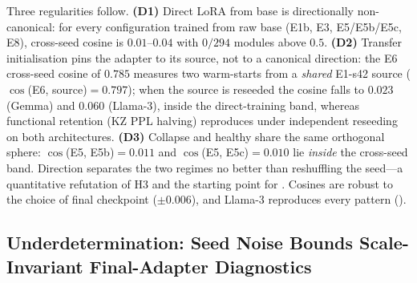 \documentclass[11pt]{article}
\begin{document}
Three regularities follow. \textbf{(D1)} Direct LoRA from base is directionally non-canonical: for every configuration trained from raw base (E1b, E3, E5/E5b/E5c, E8), cross-seed cosine is $0.01$--$0.04$ with $0/294$ modules above $0.5$. \textbf{(D2)} Transfer initialisation pins the adapter to its source, not to a canonical direction: the E6 cross-seed cosine of $0.785$ measures two warm-starts from a \emph{shared} E1-s42 source ($\cos$(E6, source)$=0.797$); when the source is reseeded the cosine falls to $0.023$ (Gemma) and $0.060$ (Llama-3), inside the direct-training band, whereas functional retention (KZ PPL halving) reproduces under independent reseeding on both architectures. \textbf{(D3)} Collapse and healthy share the same orthogonal sphere: $\cos$(E5, E5b)$=0.011$ and $\cos$(E5, E5c)$=0.010$ lie \emph{inside} the cross-seed band. Direction separates the two regimes no better than reshuffling the seed---a quantitative refutation of H3 and the starting point for . Cosines are robust to the choice of final checkpoint ($\pm0.006$), and Llama-3 reproduces every pattern ().

\subsection{Underdetermination: Seed Noise Bounds Scale-Invariant Final-Adapter Diagnostics}
\label{sec:underdetermination}
\end{document}
